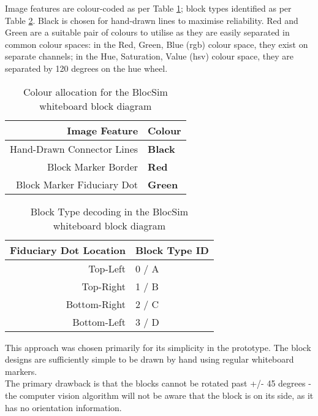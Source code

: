 Image features are colour-coded as per Table \ref{tab:color}; block types identified as per Table \ref{tab:blockid}. Black is chosen for hand-drawn lines to maximise reliability. Red and Green are a suitable pair of colours to utilise as they are easily separated in common colour spaces: in the Red, Green, Blue (\gls{rgb}) colour space, they exist on separate channels; in the Hue, Saturation, Value (\gls{hsv}) colour space, they are separated by 120 degrees on the hue wheel.

\begin{table}[ht!]
	\center
	\begin{tabular}{r l} %
		\hline
		\rowstyle{\bfseries}
		Image Feature & Colour \\
		\hline
		Hand-Drawn Connector Lines & \textbf{Black} \\
		Block Marker Border & \textbf{Red} \\
		Block Marker Fiduciary Dot & \textbf{Green} \\
		\hline
	\end{tabular}
	\caption{Colour allocation for the BlocSim whiteboard block diagram}
	\label{tab:color}
\end{table} 
\begin{table}[ht!]
	\center
	\begin{tabular}{r l} %
		\hline
		\rowstyle{\bfseries}
		Fiduciary Dot Location & Block Type ID \\
		\hline
		Top-Left & 0 / A \\
		Top-Right & 1 / B \\
		Bottom-Right & 2 / C \\
		Bottom-Left & 3 / D \\
		\hline
	\end{tabular}
	\caption{Block Type decoding in the BlocSim whiteboard block diagram}
	\label{tab:blockid}
\end{table} 
\vspace{0.5 cm}

This approach was chosen primarily for its simplicity in the prototype. The block designs are sufficiently simple to be drawn by hand using regular whiteboard markers.
\\

The primary drawback is that the blocks cannot be rotated past +/- 45 degrees - the computer vision algorithm will not be aware that the block is on its side, as it has no orientation information.


